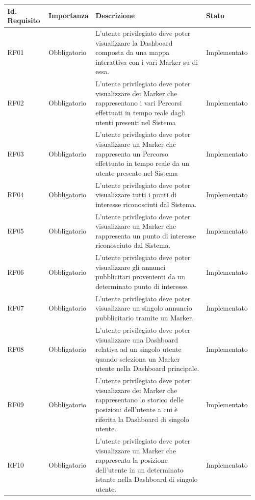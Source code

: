\documentclass[10pt]{article}
\begin{document}
\begin{longtable}{|>{\centering\arraybackslash}m{2.7cm}|>{\centering\arraybackslash}m{2.7cm}|>{\raggedright\arraybackslash}m{6cm}|>{\centering\arraybackslash}m{2.1cm}|}
    \hline
    \rowcolor{gray!25}
    \textbf{Id. Requisito} & \textbf{Importanza} & \textbf{Descrizione} & \textbf{Stato}\\
    \hline
    RF01 & Obbligatorio & L'utente privilegiato deve poter visualizzare la Dashboard composta da una mappa interattiva con i vari Marker su di essa. & Implementato \\
    \hline
    RF02 & Obbligatorio & L'utente privilegiato deve poter visualizzare dei Marker che rappresentano i vari Percorsi effettuati in tempo reale dagli utenti presenti nel Sistema & Implementato \\
    \hline
    RF03 & Obbligatorio & L'utente privilegiato deve poter visualizzare un Marker che rappresenta un Percorso effettuato in tempo reale da un utente presente nel Sistema & Implementato \\
    \hline
    RF04 & Obbligatorio & L'utente privilegiato deve poter visualizzare tutti i punti di interesse riconosciuti dal Sistema. & Implementato \\
    \hline
    RF05 & Obbligatorio & L'utente privilegiato deve poter visualizzare un Marker che rappresenta un punto di interesse riconosciuto dal Sistema. & Implementato \\
    \hline
    RF06 & Obbligatorio & L'utente privilegiato deve poter visualizzare gli annunci pubblicitari provenienti da un determinato punto di interesse. & Implementato \\
    \hline
    RF07 & Obbligatorio & L'utente privilegiato deve poter visualizzare un singolo annuncio pubblicitario tramite un Marker. & Implementato \\
    \hline
    RF08 & Obbligatorio & L'utente privilegiato deve poter visualizzare una Dashboard relativa ad un singolo utente quando seleziona un Marker utente nella Dashboard principale. & Implementato \\
    \hline
    RF09 & Obbligatorio & L'utente privilegiato deve poter visualizzare dei Marker che rappresentano lo storico delle posizioni dell'utente a cui è riferita la Dashboard di singolo utente. & Implementato \\
    \hline
    RF10 & Obbligatorio & L'utente privilegiato deve poter visualizzare un Marker che rappresenta la posizione dell'utente in un determinato istante nella Dashboard di singolo utente. & Implementato \\

\end{longtable}
\end{document}
